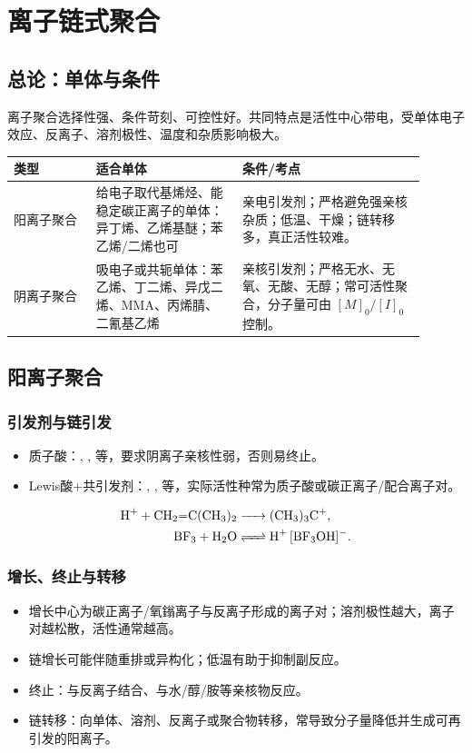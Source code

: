\documentclass[UTF8,a4paper,10pt,twocolumn]{ctexart}
\begin{document}
\section{离子链式聚合}
\subsection{总论：单体与条件}
离子聚合选择性强、条件苛刻、可控性好。共同特点是活性中心带电，受单体电子效应、反离子、溶剂极性、温度和杂质影响极大。
\begin{center}
  \scriptsize
  \begin{tabularx}{\linewidth}{p{0.18\linewidth}p{0.32\linewidth}p{0.40\linewidth}}
    \toprule
    类型    & 适合单体                                  & 条件/考点                                              \\
    \midrule
    阳离子聚合 & 给电子取代基烯烃、能稳定碳正离子的单体：异丁烯、乙烯基醚；苯乙烯/二烯也可 & 亲电引发剂；严格避免强亲核杂质；低温、干燥；链转移多，真正活性较难。                 \\
    阴离子聚合 & 吸电子或共轭单体：苯乙烯、丁二烯、异戊二烯、MMA、丙烯腈、二氰基乙烯   & 亲核引发剂；严格无水、无氧、无酸、无醇；常可活性聚合，分子量可由 $[M]_0/[I]_0$ 控制。 \\
    \bottomrule
  \end{tabularx}
\end{center}

\subsection{阳离子聚合}
\subsubsection{引发剂与链引发}
\begin{itemize}
  \item 质子酸：, ,  等，要求阴离子亲核性弱，否则易终止。
  \item Lewis酸+共引发剂：, ,  等，实际活性种常为质子酸或碳正离子/配合离子对。
\end{itemize}
\begin{align*}
  \ce{H+ + CH2=C(CH3)2} & \ce{-> (CH3)3C+},     \\
  \ce{BF3 + H2O}        & \ce{<=> H+ [BF3OH]-}.
\end{align*}

\subsubsection{增长、终止与转移}
\begin{itemize}
  \item 增长中心为碳正离子/氧鎓离子与反离子形成的离子对；溶剂极性越大，离子对越松散，活性通常越高。
  \item 链增长可能伴随重排或异构化；低温有助于抑制副反应。
  \item 终止：与反离子结合、与水/醇/胺等亲核物反应。
  \item 链转移：向单体、溶剂、反离子或聚合物转移，常导致分子量降低并生成可再引发的阳离子。
\end{itemize}
\end{document}
